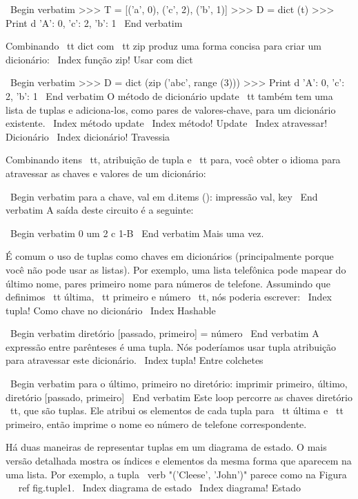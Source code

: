 \documentclass[10pt]{book}
\begin{document}
{{{{{{{{{\ Begin {verbatim}
>>> T = [('a', 0), ('c', 2), ('b', 1)]
>>> D = dict (t)
>>> Print d
{'A': 0, 'c': 2, 'b': 1}
\ End {verbatim}

Combinando {\ tt dict} com {\ tt zip} produz uma forma concisa
para criar um dicionário:
\ Index {função zip! Usar com dict}

\ Begin {verbatim}
>>> D = dict (zip ('abc', range (3)))
>>> Print d
{'A': 0, 'c': 2, 'b': 1}
\ End {verbatim}
%
O método de dicionário {update \ tt} também tem uma lista de tuplas
e adiciona-los, como pares de valores-chave, para um dicionário existente.
\ Index {método update}
\ Index {método! Update}
\ Index {atravessar! Dicionário}
\ Index {dicionário! Travessia}

Combinando itens {\ tt}, atribuição de tupla e {\ tt para}, você
obter o idioma para atravessar as chaves e valores de um dicionário:

\ Begin {verbatim}
para a chave, val em d.items ():
    impressão val, key
\ End {verbatim}
%
A saída deste circuito é a seguinte:

\ Begin {verbatim}
0 um
2 c
1-B
\ End {verbatim}
%
Mais uma vez.

É comum o uso de tuplas como chaves em dicionários (principalmente porque
você não pode usar as listas). Por exemplo, uma lista telefônica pode mapear
do último nome, pares primeiro nome para números de telefone. Assumindo
que definimos {\ tt última}, {\ tt primeiro} e {número \ tt}, nós
poderia escrever:
\ Index {tupla! Como chave no dicionário}
\ Index {} Hashable

\ Begin {verbatim}
diretório [passado, primeiro] = número
\ End {verbatim}
%
A expressão entre parênteses é uma tupla. Nós poderíamos usar tupla
atribuição para atravessar este dicionário.
\ Index {tupla! Entre colchetes}

\ Begin {verbatim}
para o último, primeiro no diretório:
    imprimir primeiro, último, diretório [passado, primeiro]
\ End {verbatim}
%
Este loop percorre as chaves {diretório \ tt}, que são tuplas. Ele
atribui os elementos de cada tupla para {\ tt última} e {\ tt primeiro}, então
imprime o nome eo número de telefone correspondente.

Há duas maneiras de representar tuplas em um diagrama de estado. O mais
versão detalhada mostra os índices e elementos da mesma forma que aparecem na
uma lista. Por exemplo, a tupla \ verb "('Cleese', 'John')" parece
como na Figura ~ \ ref {fig.tuple1}.
\ Index {diagrama de estado}
\ Index {diagrama! Estado}

}}}}}}}}}
\end{document}
